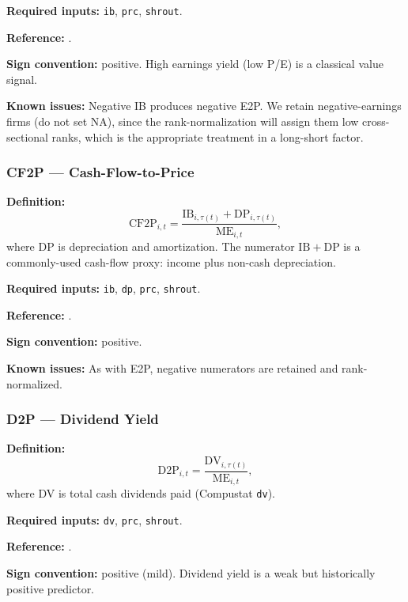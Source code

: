 \textbf{Required inputs:} \texttt{ib}, \texttt{prc}, \texttt{shrout}.

\textbf{Reference:} \cite{Basu1977,FamaFrench1992}.

\textbf{Sign convention:} positive. High earnings yield (low P/E) is a
classical value signal.

\textbf{Known issues:} Negative IB produces negative E2P. We retain
negative-earnings firms (do not set NA), since the rank-normalization
will assign them low cross-sectional ranks, which is the appropriate
treatment in a long-short factor.

\subsubsection{CF2P --- Cash-Flow-to-Price}

\textbf{Definition:}
\begin{equation}
\mathrm{CF2P}_{i,t} = \frac{\mathrm{IB}_{i,\tau(t)} + \mathrm{DP}_{i,\tau(t)}}
                            {\mathrm{ME}_{i,t}},
\label{eq:cf2p}
\end{equation}
where DP is depreciation and amortization. The numerator
$\mathrm{IB} + \mathrm{DP}$ is a commonly-used cash-flow proxy:
income plus non-cash depreciation.

\textbf{Required inputs:} \texttt{ib}, \texttt{dp}, \texttt{prc},
\texttt{shrout}.

\textbf{Reference:} \cite{Lakonishok1994}.

\textbf{Sign convention:} positive.

\textbf{Known issues:} As with E2P, negative numerators are retained
and rank-normalized.

\subsubsection{D2P --- Dividend Yield}

\textbf{Definition:}
\begin{equation}
\mathrm{D2P}_{i,t} = \frac{\mathrm{DV}_{i,\tau(t)}}{\mathrm{ME}_{i,t}},
\label{eq:d2p}
\end{equation}
where DV is total cash dividends paid (Compustat \texttt{dv}).

\textbf{Required inputs:} \texttt{dv}, \texttt{prc}, \texttt{shrout}.

\textbf{Reference:} \cite{LitzenbergerRamaswamy1979,FamaFrench1988}.

\textbf{Sign convention:} positive (mild). Dividend yield is a weak but
historically positive predictor.

